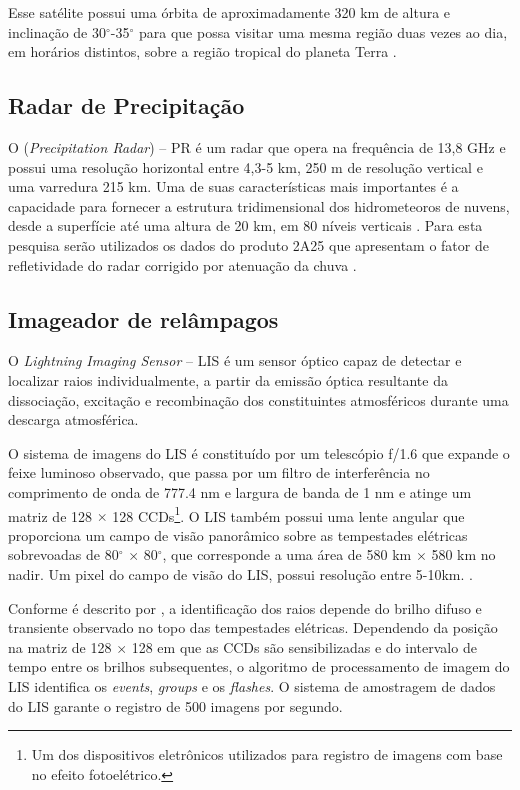 Esse satélite possui uma órbita de aproximadamente 320 km de altura e inclinação de 30$^{\circ}$-35$^{\circ}$ para que possa visitar uma mesma região duas vezes ao dia, em horários distintos, sobre a região tropical do planeta Terra \cite{simpson1988}.   

\subsection{Radar de Precipitação}

O (\textit{Precipitation Radar}) -- PR  é um radar que opera na frequência de 13,8 GHz e possui uma resolução horizontal entre 4,3-5 km, 250 m de resolução vertical e uma varredura 215 km. Uma de suas características mais importantes é a capacidade para fornecer a estrutura tridimensional dos hidrometeoros de nuvens, desde a superfície até uma altura de 20 km, em 80 níveis verticais \cite{kummerok1998}. Para esta pesquisa serão utilizados os dados do produto 2A25 que apresentam o fator de refletividade do radar corrigido por atenuação da chuva \cite{2A25}.

\subsection{Imageador de relâmpagos}

O \textit{Lightning Imaging Sensor} -- LIS  é um sensor óptico capaz de detectar e localizar raios individualmente, a partir da emissão óptica resultante da dissociação, excitação e recombinação dos constituintes atmosféricos durante uma descarga atmosférica. 

O sistema de imagens do LIS é constituído por um telescópio f/1.6 que expande o feixe luminoso observado, que passa por um filtro de interferência no comprimento de onda de 777.4 nm e largura de banda de 1 nm e atinge um matriz de 128 $\times$ 128 CCDs\footnote{Um dos dispositivos eletrônicos utilizados para registro de imagens com base no efeito fotoelétrico.}. O LIS também possui uma lente angular que proporciona um campo de visão panorâmico sobre as tempestades elétricas sobrevoadas de 80$^{\circ}$ $\times$ 80$^{\circ}$, que corresponde a uma área de 580 km $\times$ 580 km no nadir. Um pixel do campo de visão do LIS, possui resolução entre 5-10km.  \cite{christian2000LISalgorithm,boccippio1996science,trmmhandbook}. 


Conforme é descrito por , a identificação dos raios depende do brilho difuso e transiente observado no topo das tempestades elétricas. Dependendo da posição na matriz de 128 $\times$ 128 em que as CCDs são sensibilizadas e do intervalo de tempo entre os brilhos subsequentes, o algoritmo de processamento de imagem do LIS identifica os \textit{events}, \textit{groups} e os \textit{flashes}. O sistema de amostragem de dados do LIS garante o registro de 500 imagens por segundo.

